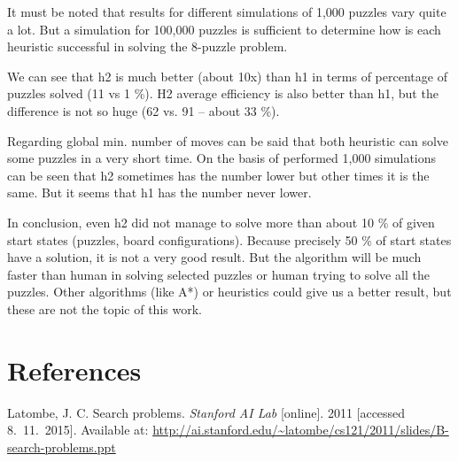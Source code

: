 \documentclass[a4paper]{article}
\begin{document}
It must be noted that results for different simulations of 1,000 puzzles vary quite a lot. But a simulation for 100,000 puzzles is sufficient to determine how is each heuristic successful in solving the 8-puzzle problem. 

We can see that h2 is much better (about 10x) than h1 in terms of percentage of puzzles solved (11 vs 1 \%). H2 average efficiency is also better than h1, but the difference is not so huge (62 vs. 91 -- about 33 \%). 

Regarding global min. number of moves can be said that both heuristic can solve some puzzles in a very short time. On the basis of performed 1,000 simulations can be seen that h2 sometimes has the number lower but other times it is the same. But it seems that h1 has the number never lower.

In conclusion, even h2 did not manage to solve more than about 10 \% of given start states (puzzles, board configurations). Because precisely 50 \% of start states have a solution, it is not a very good result. But the algorithm will be much faster than human in solving selected puzzles or human trying to solve all the puzzles. Other algorithms (like A*) or heuristics could give us a better result, but these are not the topic of this work.

\section{References}

Latombe, J. C. Search problems. \textit{Stanford AI Lab} [online]. 2011 [accessed 8.~11.~2015]. Available at: \url{http://ai.stanford.edu/~latombe/cs121/2011/slides/B-search-problems.ppt}
\end{document}
